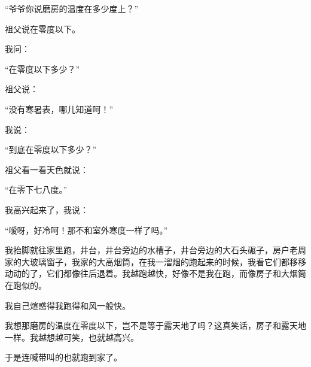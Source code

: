 \par “爷爷你说磨房的温度在多少度上？”
\par 祖父说在零度以下。
\par 我问：
\par “在零度以下多少？”
\par 祖父说：
\par “没有寒暑表，哪儿知道呵！”
\par 我说：
\par “到底在零度以下多少？”
\par 祖父看一看天色就说：
\par “在零下七八度。”
\par 我高兴起来了，我说：
\par “嗳呀，好冷呵！那不和室外寒度一样了吗。”
\par 我抬脚就往家里跑，井台，井台旁边的水槽子，井台旁边的大石头碾子，房户老周家的大玻璃窗子，我家的大高烟筒，在我一溜烟的跑起来的时候，我看它们都移移动动的了，它们都像往后退着。我越跑越快，好像不是我在跑，而像房子和大烟筒在跑似的。
\par 我自己煊惑得我跑得和风一般快。
\par 我想那磨房的温度在零度以下，岂不是等于露天地了吗？这真笑话，房子和露天地一样。我越想越可笑，也就越高兴。
\par 于是连喊带叫的也就跑到家了。
